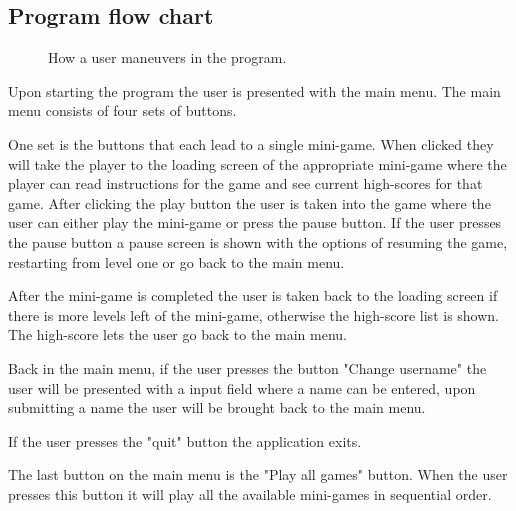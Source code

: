 
\subsection{Program flow chart}

\begin{figure}[ht]
	\capstart
	\def\svgwidth{\textwidth}
	
	\caption[Program flow chart]{How a user maneuvers in the program.}
	\label{fig:program_flow_chart}
\end{figure}

Upon starting the program the user is presented with the main menu.
The main menu consists of four sets of buttons.

One set is the buttons that each lead to a single mini-game. 
When clicked they will take the player to the loading screen of the appropriate mini-game where the player can read instructions for the game and see current high-scores for that game.
After clicking the play button the user is taken into the game where the user can either play the mini-game or press the pause button.
If the user presses the pause button a pause screen is shown with the options of resuming the game, restarting from level one or go back to the main menu.

After the mini-game is completed the user is taken back to the loading screen if there is more levels left of the mini-game, otherwise the high-score list is shown.
The high-score lets the user go back to the main menu.

Back in the main menu, if the user presses the button "Change username" the user will be presented with a input field where a name can be entered, upon submitting a name the user will be brought back to the main menu.

If the user presses the "quit" button the application exits.

The last button on the main menu is the "Play all games" button. When the user presses this button it will play all the available mini-games in sequential order.